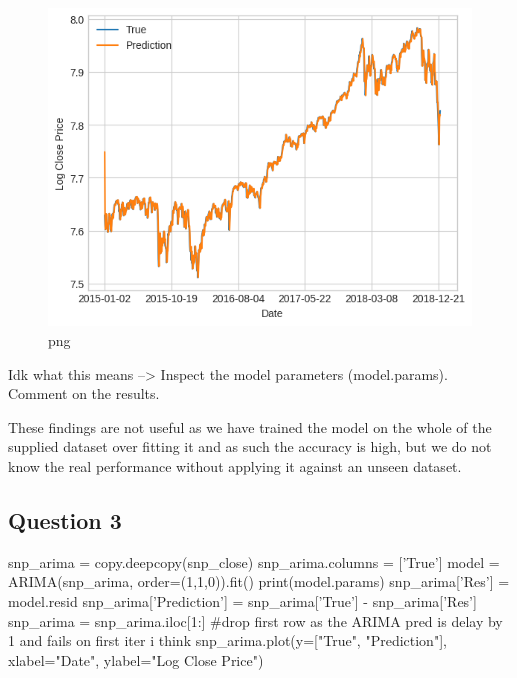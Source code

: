 \begin{figure}[h]
\centering
\includegraphics[scale=0.75]{ARMAvsARIMA_files/ARMAvsARIMA_6_3.png}
\caption{png}
\end{figure}

Idk what this means --\textgreater{} Inspect the model parameters
(model.params). Comment on the results.

These findings are not useful as we have trained the model on the whole
of the supplied dataset over fitting it and as such the accuracy is
high, but we do not know the real performance without applying it
against an unseen dataset.

\hypertarget{question-3}{%
\subsection{Question 3}\label{question-3}}

\begin{python}[language=Python]
snp_arima = copy.deepcopy(snp_close)
snp_arima.columns = ['True']
model = ARIMA(snp_arima, order=(1,1,0)).fit()
print(model.params)
snp_arima['Res'] = model.resid
snp_arima['Prediction'] = snp_arima['True'] - snp_arima['Res']
snp_arima = snp_arima.iloc[1:] #drop first row as the ARIMA pred is delay by 1 and fails on first iter i think
snp_arima.plot(y=["True", "Prediction"], xlabel="Date", ylabel="Log Close Price")
\end{python}

